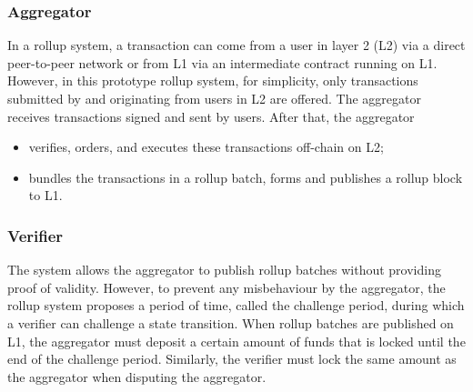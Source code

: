 \documentclass{article}
\begin{document}
\subsubsection{Aggregator}
In a rollup system, a transaction can come from a user in layer 2 (L2) via a direct peer-to-peer network or from L1 via an intermediate contract running on L1. However, in this prototype rollup system, for simplicity, only transactions submitted by and originating from users in L2 are offered. The aggregator receives transactions signed and sent by users. After that, the aggregator
\begin{itemize} 
\item verifies, orders, and executes these transactions off-chain on L2; 
\item bundles the transactions in a rollup batch, forms and publishes a rollup block to L1. 
\end{itemize}


\subsubsection{Verifier}
The system allows the aggregator to publish rollup batches without providing proof of validity. However, to prevent any misbehaviour by the aggregator, the rollup system proposes a period of time, called the challenge period, during which a verifier can challenge a state transition. When rollup batches are published on L1, the aggregator must deposit a certain amount of funds that is locked until the end of the challenge period. Similarly, the verifier must lock the same amount as the aggregator when disputing the aggregator.
\end{document}
